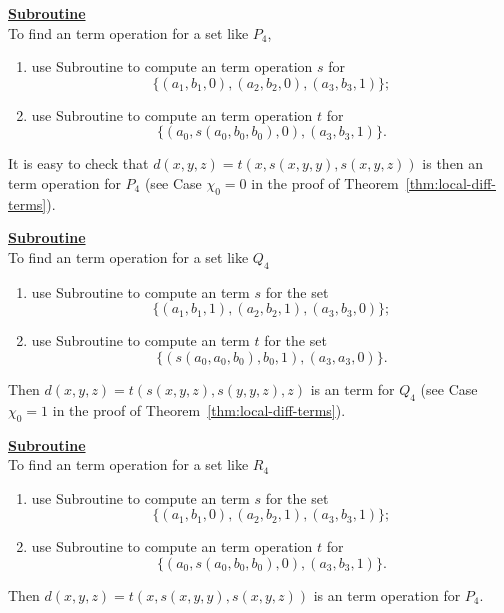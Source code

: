 \medskip

\noindent \underline{\textbf{Subroutine }}\\[4pt]
To find an \ld term operation for a set like $P_4$,
\begin{enumerate}
\item use Subroutine  to compute an \ld term operation $s$ for
\begin{equation*}
\{(a_1, b_1, 0),  (a_2, b_2, 0),  (a_3, b_3, 1)\};
\end{equation*}
\item use Subroutine  to compute an \ld term operation $t$ for
\begin{equation*}
\{(a_0, s(a_0, b_0, b_0), 0), (a_3, b_3, 1)\}.
\end{equation*}
\end{enumerate}
It is easy to check that
$d(x,y,z) = t(x, s(x,y,y), s(x,y,z))$
is then an \ld term operation for $P_4$ 
(see Case $\chi_0=0$ in the proof of Theorem~\ref{thm:local-diff-terms}).

\medskip

\noindent \underline{\textbf{Subroutine }}\\[4pt]
To find an \ld term operation for a set like $Q_4$
\begin{enumerate}
\item 
use Subroutine  to compute an \ld term $s$ for the set
\begin{equation*}
\{(a_1, b_1, 1), (a_2, b_2, 1), (a_3, b_3, 0)\};
\end{equation*}
\item  use Subroutine  to compute an \ld term $t$
for the set
\begin{equation*}
\{(s(a_0, a_0, b_0), b_0, 1),  (a_3,a_3,0)\}.
\end{equation*}
\end{enumerate}
Then 
$d(x,y,z) = t(s(x,y,z), s(y,y,z),z)$
is an \ld term  for $Q_4$ (see Case $\chi_0=1$ in the proof of Theorem~\ref{thm:local-diff-terms}).


\medskip

\noindent \underline{\textbf{Subroutine }}\\[4pt]
To find an \ld term operation for a set like $R_4$
\begin{enumerate}
\item 
use Subroutine  to compute an \ld term $s$ for the set
\begin{equation*}
\{(a_1, b_1, 0), (a_2, b_2, 1), (a_3, b_3, 1)\};
\end{equation*}
\item use Subroutine  to compute an \ld term operation $t$ for
\begin{equation*}
\{(a_0, s(a_0, b_0, b_0), 0), (a_3, b_3, 1)\}.
\end{equation*}
\end{enumerate}
Then 
$d(x,y,z) = t(x, s(x,y,y), s(x,y,z))$
is an \ld term operation for $P_4$. 

